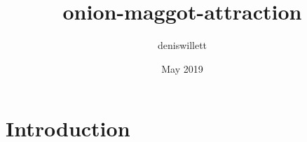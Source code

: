 \documentclass{article}
\title{onion-maggot-attraction}
\author{deniswillett }
\date{May 2019}
\begin{document}
\maketitle

\section{Introduction}
\end{document}
